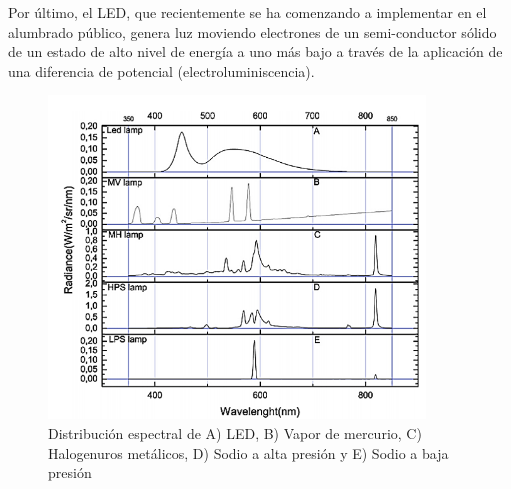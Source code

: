 Por último, el LED, que recientemente se ha comenzando a implementar en el alumbrado público, genera luz moviendo electrones de un semi-conductor sólido de un estado de alto nivel de energía a uno más bajo a través de la aplicación de una diferencia de potencial (electroluminiscencia).


\begin{table}[htb]
\centering
\caption{Principales fuentes de luz artificial}
\label{tab:luzartificial}
\end{table}


\begin{figure}[htb]
  \centering
    \includegraphics[width=100mm, scale=1]{distribucionespectral}
  \caption{Distribución espectral de A) LED, B) Vapor de mercurio, C) Halogenuros metálicos, D) Sodio a alta presión y E) Sodio a baja presión \citep{Solano2013b}}
  \label{distribucionespectral}
\end{figure}

